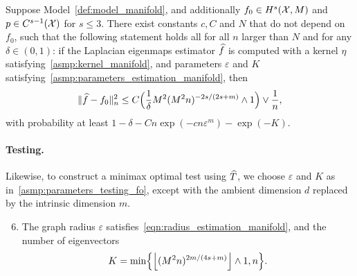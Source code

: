 \begin{theorem}
	\label{thm:laplacian_eigenmaps_estimation_manifold}
	Suppose Model~\ref{def:model_manifold}, and additionally $f_0 \in H^s(\mathcal{X},M)$ and $p \in C^{s - 1}(\mathcal{X})$ for $s \leq 3$. There exist constants $c,C$ and $N$ that do not depend on $f_0$, such that the following statement holds all for all $n$ larger than $N$ and for any $\delta \in (0,1)$: if the Laplacian eigenmaps estimator $\widehat{f}$ is computed with a kernel $\eta$ satisfying~\ref{asmp:kernel_manifold}, and parameters $\varepsilon$ and $K$ satisfying~\ref{asmp:parameters_estimation_manifold}, then
	\begin{equation}
	\label{eqn:laplacian_eigenmaps_estimation_manifold}
	\|\widehat{f} - f_0\|_n^2 \leq C\Bigl(\frac{1}{\delta}M^2(M^2n)^{-2s/(2s + m)} \wedge 1\Bigr) \vee \frac{1}{n},
	\end{equation}
	with probability at least $1 - \delta - Cn\exp(-cn\varepsilon^m) - \exp(-K)$.
\end{theorem}

\paragraph{Testing.}
Likewise, to construct a minimax optimal test using $\widehat{T}$, we choose $\varepsilon$ and $K$ as in~\ref{asmp:parameters_testing_fo}, except with the ambient dimension $d$ replaced by the intrinsic dimension $m$.
\begin{enumerate}[label=(P\arabic*)]
	\setcounter{enumi}{5}
	\item 
	\label{asmp:parameters_testing_manifold}
	The graph radius $\varepsilon$ satisfies~\eqref{eqn:radius_estimation_manifold}, and the number of eigenvectors
	\begin{equation*}
	K = \min\Bigl\{\left\lfloor (M^2n)^{2m/(4s + m)} \right\rfloor \wedge 1,n \Bigr\}.
	\end{equation*}
\end{enumerate}

